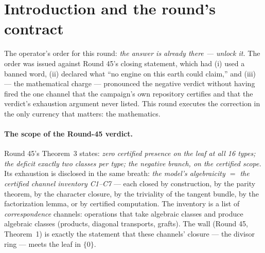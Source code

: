 \documentclass[11pt]{article}
\begin{document}
\section{Introduction and the round's contract}

The operator's order for this round: \emph{the answer is already there --- unlock it.}  The order
was issued against Round 45's closing statement, which had (i) used a banned word, (ii) declared
what ``no engine on this earth could claim,'' and (iii) --- the mathematical charge --- pronounced
the negative verdict without having fired the one channel that the campaign's own repository
certifies and that the verdict's exhaustion argument never listed.  This round executes the
correction in the only currency that matters: the mathematics.

\paragraph{The scope of the Round-45 verdict.}  Round 45's Theorem~3 states: \emph{zero certified
presence on the leaf at all 16 types; the deficit exactly two classes per type; the negative
branch, on the certified scope.}  Its exhaustion is disclosed in the same breath: \emph{the
model's algebraicity $=$ the certified channel inventory C1--C7} --- each closed by construction,
by the parity theorem, by the character closure, by the triviality of the tangent bundle, by the
factorization lemma, or by certified computation.  The inventory is a list of
\emph{correspondence} channels: operations that take algebraic classes and produce algebraic
classes (products, diagonal transports, grafts).  The wall (Round 45, Theorem~1) is exactly the
statement that these channels' closure --- the divisor ring --- meets the leaf in $\{0\}$.
\end{document}
